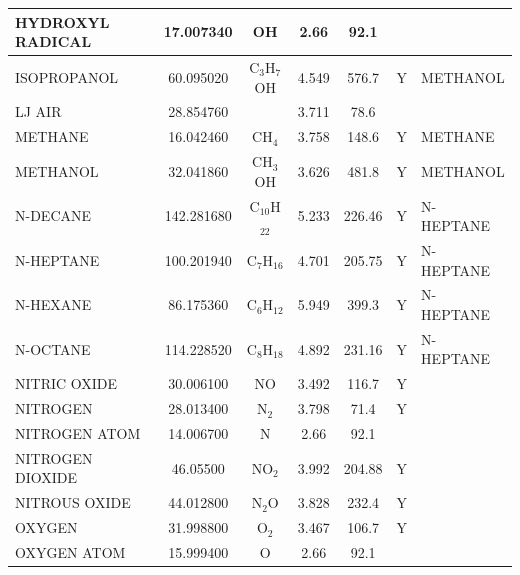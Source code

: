 \documentclass[11pt]{book}
\begin{document}
\begin{longtable}{@{\extracolsep{\fill}}|l|c|c|c|c|c|l|}
{\ct HYDROXYL RADICAL}   & 17.007340  & OH               & 2.66     & 92.1     &          &                            \\ \hline
{\ct ISOPROPANOL}        & 60.095020  & C$_3$H$_7$OH     & 4.549    & 576.7    &  Y       &  {\ct METHANOL}            \\ \hline
{\ct LJ AIR}             & 28.854760  &                  & 3.711    & 78.6     &          &                            \\ \hline
{\ct METHANE}            & 16.042460  & CH$_4$           & 3.758    & 148.6    &  Y       &  {\ct METHANE}             \\ \hline
{\ct METHANOL}           & 32.041860  & CH$_3$OH         & 3.626    & 481.8    &  Y       &  {\ct METHANOL}            \\ \hline
{\ct N-DECANE}           & 142.281680 & C$_{10}$H$_{22}$ & 5.233    & 226.46   &  Y       &  {\ct N-HEPTANE}           \\ \hline
{\ct N-HEPTANE}          & 100.201940 & C$_7$H$_{16}$    & 4.701    & 205.75   &  Y       &  {\ct N-HEPTANE}           \\ \hline
{\ct N-HEXANE}           & 86.175360  & C$_6$H$_{12}$    & 5.949    & 399.3    &  Y       &  {\ct N-HEPTANE}           \\ \hline
{\ct N-OCTANE}           & 114.228520 & C$_8$H$_{18}$    & 4.892    & 231.16   &  Y       &  {\ct N-HEPTANE}           \\ \hline
{\ct NITRIC OXIDE}       & 30.006100  & NO               & 3.492    & 116.7    &  Y       &                            \\ \hline
{\ct NITROGEN}           & 28.013400  & N$_2$            & 3.798    & 71.4     &  Y       &                            \\ \hline
{\ct NITROGEN ATOM}      & 14.006700  & N                & 2.66     & 92.1     &          &                            \\ \hline
{\ct NITROGEN DIOXIDE}   & 46.05500   & NO$_2$           & 3.992    & 204.88   &  Y       &                            \\ \hline
{\ct NITROUS OXIDE}      & 44.012800  & N$_2$O           & 3.828    & 232.4    &  Y       &                            \\ \hline
{\ct OXYGEN}             & 31.998800  & O$_2$            & 3.467    & 106.7    &  Y       &                            \\ \hline
{\ct OXYGEN ATOM}        & 15.999400  & O                & 2.66     & 92.1     &          &                            \\ \hline

\end{longtable}
\end{document}
